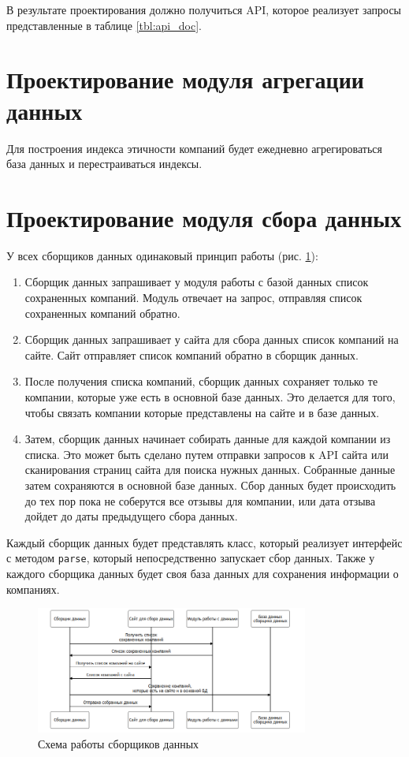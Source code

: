 \documentclass[PI, VKR]{HSEUniversity}
\begin{document}
В результате проектирования должно получиться API, которое реализует запросы представленные в таблице  \ref{tbl:api_doc}.


\section{Проектирование модуля агрегации данных}
\label{sec:orgb0608b1}
Для построения индекса этичности компаний будет ежедневно агрегироваться база данных и перестраиваться индексы.
\section{Проектирование модуля сбора данных}
\label{sec:orgdee96a1}
У всех сборщиков данных одинаковый принцип работы (рис. \ref{fig:parser_flow}):
\begin{enumerate}
\item Сборщик данных запрашивает у модуля работы с базой данных список сохраненных компаний. Модуль отвечает на запрос, отправляя список сохраненных компаний обратно.
\item Сборщик данных запрашивает у сайта для сбора данных список компаний на сайте. Сайт отправляет список компаний обратно в сборщик данных.
\item После получения списка компаний, сборщик данных сохраняет только те компании, которые уже есть в основной базе данных. Это делается для того, чтобы связать компании которые представлены на сайте и в базе данных.
\item Затем, сборщик данных начинает собирать данные для каждой компании из списка. Это может быть сделано путем отправки запросов к API сайта или сканирования страниц сайта для поиска нужных данных. Собранные данные затем сохраняются в основной базе данных. Сбор данных будет происходить до тех пор пока не соберутся все отзывы для компании, или дата отзыва дойдет до даты предыдущего сбора данных.
\end{enumerate}

Каждый сборщик данных будет представлять класс, который реализует интерфейс с методом \texttt{parse}, который непосредственно запускает сбор данных. Также у каждого сборщика данных будет своя база данных для сохранения информации о компаниях.

\begin{figure}[h!]
\centering
\includegraphics[width=0.8\textwidth]{img/mermaid/parser_flow.png}
\caption{\label{fig:parser_flow}Схема работы сборщиков данных}
\end{figure}
\end{document}
